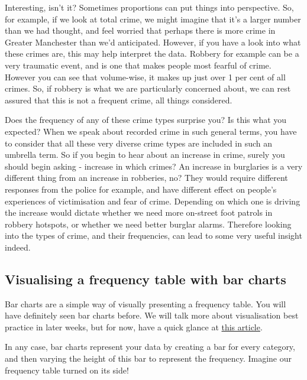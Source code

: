 \documentclass[
]{book}
\begin{document}
Interesting, isn't it? Sometimes proportions can put things into perspective. So, for example, if we look at total crime, we might imagine that it's a larger number than we had thought, and feel worried that perhaps there is more crime in Greater Manchester than we'd anticipated. However, if you have a look into what these crimes are, this may help interpret the data. Robbery for example can be a very traumatic event, and is one that makes people most fearful of crime. However you can see that volume-wise, it makes up just over 1 per cent of all crimes. So, if robbery is what we are particularly concerned about, we can rest assured that this is not a frequent crime, all things considered.

Does the frequency of any of these crime types surprise you? Is this what you expected? When we speak about recorded crime in such general terms, you have to consider that all these very diverse crime types are included in such an umbrella term. So if you begin to hear about an increase in crime, surely you should begin asking - increase in which crimes? An increase in burglaries is a very different thing from an increase in robberies, no? They would require different responses from the police for example, and have different effect on people's experiences of victimisation and fear of crime. Depending on which one is driving the increase would dictate whether we need more on-street foot patrols in robbery hotspots, or whether we need better burglar alarms. Therefore looking into the types of crime, and their frequencies, can lead to some very useful insight indeed.

\hypertarget{visualising-a-frequency-table-with-bar-charts}{%
\subsection{Visualising a frequency table with bar charts}\label{visualising-a-frequency-table-with-bar-charts}}

Bar charts are a simple way of visually presenting a frequency table. You will have definitely seen bar charts before. We will talk more about visualisation best practice in later weeks, but for now, have a quick glance at \href{https://flowingdata.com/2015/08/31/bar-chart-baselines-start-at-zero/}{this article}.

In any case, bar charts represent your data by creating a bar for every category, and then varying the height of this bar to represent the frequency. Imagine our frequency table turned on its side!
\end{document}
